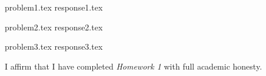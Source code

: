\documentclass[letterpaper, 12pt]{article}
\begin{document}

{problem1.tex}
{response1.tex}

{problem2.tex}
{response2.tex}

{problem3.tex}
{response3.tex}

\par

I affirm that I have completed \textit{Homework 1} with full academic honesty.
\end{document}
